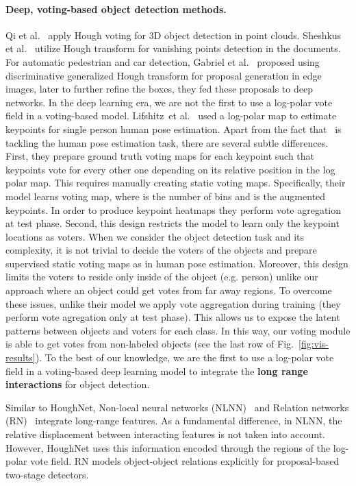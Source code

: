 \documentclass[runningheads]{llncs}
\newcommand{\etal}{et al.}
\begin{document}
\paragraph{\textbf{Deep, voting-based object detection methods.}}   Qi \etal~\cite{3dhough} apply Hough voting for 3D object detection in point clouds. Sheshkus \etal~\cite{otherhoughnet}  utilize Hough transform for vanishing points detection in the documents.  For automatic pedestrian and car detection, Gabriel \etal~\cite{hough_proposal} proposed using discriminative generalized Hough transform for proposal generation in edge images, later to further refine the boxes, they fed these proposals to deep networks.  In the deep learning era, we are not the first to use a log-polar vote field in a voting-based model. Lifshitz~\etal~\cite{consensus} used a log-polar map to estimate keypoints for single person human pose estimation. Apart from the fact that~\cite{consensus} is tackling the human pose estimation task, there are several subtle differences. First, they prepare ground truth voting maps for each keypoint such that keypoints vote for every other one depending on its relative position in the log polar map. This requires manually creating static voting maps. Specifically, their model learns  voting map, where  is the number of bins and  is the augmented keypoints. In order to produce keypoint heatmaps they perform vote agregation at test phase. Second, this design restricts the model to learn only the keypoint locations as voters. When we consider the object detection task and its complexity, it is not trivial to decide the voters of the objects and prepare supervised static voting maps as in human pose estimation. Moreover, this design limits the voters to reside only inside of the object (e.g. person) unlike our approach where an object could get votes from far away regions. To overcome these issues, unlike their model we apply vote aggregation during training (they perform vote agregation only at test phase). This allows us to expose the latent patterns between objects and voters for each class. In this way, our voting module is able to get votes from non-labeled objects  (see the last row of Fig.~\ref{fig:vis-results}). To the best of our knowledge, we are the first to use a log-polar vote field in a voting-based deep learning  model to integrate the \textbf{long range interactions} for object detection.


Similar to HoughNet, Non-local neural networks (NLNN)~\cite{nlnn} and Relation networks (RN)~\cite{relation_networks} integrate long-range features.  As a fundamental difference, in NLNN, the relative displacement between interacting features is not taken into account. However, HoughNet uses this information encoded through the regions of the log-polar vote field. RN models object-object relations explicitly for proposal-based two-stage detectors. 
\end{document}
